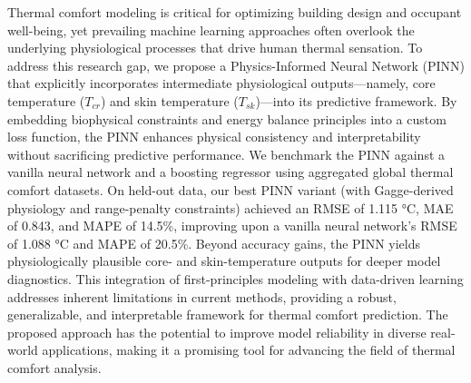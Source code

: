 Thermal comfort modeling is critical for optimizing building design and occupant well-being, yet prevailing machine learning approaches often overlook the underlying physiological processes that drive human thermal sensation. To address this research gap, we propose a Physics-Informed Neural Network (PINN) that explicitly incorporates intermediate physiological outputs—namely, core temperature ($T_{cr}$) and skin temperature ($T_{sk}$)—into its predictive framework. By embedding biophysical constraints and energy balance principles into a custom loss function, the PINN enhances physical consistency and interpretability without sacrificing predictive performance. We benchmark the PINN against a vanilla neural network and a boosting regressor using aggregated global thermal comfort datasets. On held-out data, our best PINN variant (with Gagge-derived physiology and range-penalty constraints) achieved an RMSE of 1.115 °C, MAE of 0.843, and MAPE of 14.5\%, improving upon a vanilla neural network’s RMSE of 1.088 °C and MAPE of 20.5\%. Beyond accuracy gains, the PINN yields physiologically plausible core- and skin-temperature outputs for deeper model diagnostics. This integration of first-principles modeling with data-driven learning addresses inherent limitations in current methods, providing a robust, generalizable, and interpretable framework for thermal comfort prediction. The proposed approach has the potential to improve model reliability in diverse real-world applications, making it a promising tool for advancing the field of thermal comfort analysis.
